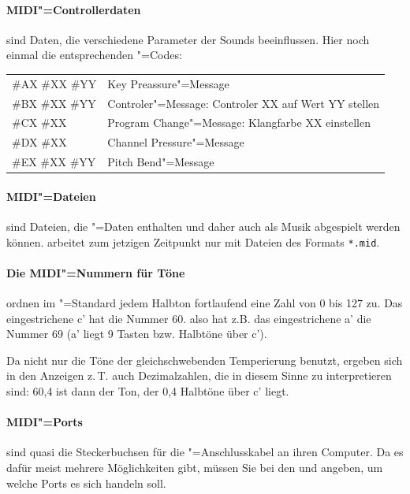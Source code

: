 \paragraph{MIDI"=Controllerdaten}\label{sec:DV_MIDICON} sind
  Daten, die verschiedene Parameter der Sounds beeinflussen.  Hier noch
  einmal die entsprechenden "=Codes:

  \begin{tabular}{l@{ \dots }l}
    \#AX \#XX \#YY&Key Preassure"=Message\\
    \#BX \#XX \#YY&Controler"=Message: Controler XX auf Wert YY stellen\\
    \#CX \#XX&Program Change"=Message: Klangfarbe XX einstellen\\
    \#DX \#XX&Channel Pressure"=Message\\
    \#EX \#XX \#YY&Pitch Bend"=Message
  \end{tabular}

\paragraph{MIDI"=Dateien}\label{sec:DV_MIDIFILE} sind Dateien,
  die "=Daten enthalten und daher auch als
  Musik abgespielt werden können. \mutabor{} arbeitet zum jetzigen
  Zeitpunkt nur mit Dateien des Formats \texttt{*.mid}.

\paragraph{Die MIDI"=Nummern für Töne}\label{sec:DV_MIDINOTES}
  ordnen im "=Standard jedem Halbton
  fortlaufend eine Zahl von 0 bis 127 zu. Das eingestrichene c' hat
  die Nummer 60. also hat z.B. das eingestrichene a' die Nummer 69 (a'
  liegt 9 Tasten bzw. Halbtöne über c').

  Da \mutabor{} nicht nur die Töne der gleichschwebenden Temperierung
  benutzt, ergeben sich in den Anzeigen z.\,T. auch Dezimalzahlen, die
  in diesem Sinne zu interpretieren sind: 60,4 ist dann der Ton, der
  0,4 Halbtöne über c' liegt.

\paragraph{MIDI"=Ports}\label{sec:DV_PORT} sind quasi die
  Steckerbuchsen für die "=Anschlusskabel an
  ihren Computer. Da es dafür meist mehrere Möglichkeiten gibt, müssen
  Sie bei den  und
   angeben, um welche Ports es sich
  handeln soll.

